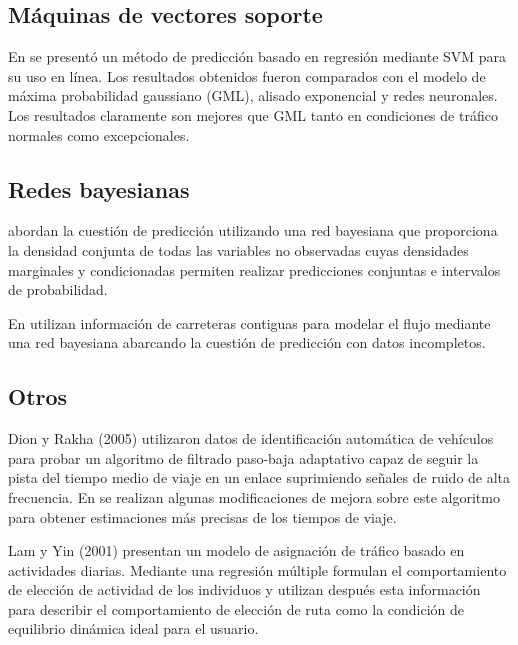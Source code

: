 \documentclass{llncs}
\begin{document}
\subsection{Máquinas de vectores soporte}

En \cite{castro2009online} se presentó un método de predicción basado en regresión mediante SVM para su uso en línea. Los resultados obtenidos fueron comparados con el modelo de máxima probabilidad gaussiano (GML), alisado exponencial y redes neuronales. Los resultados claramente son mejores que GML tanto en condiciones de tráfico normales como excepcionales.



\subsection{Redes bayesianas}
\cite{castillo2008predicting} abordan la cuestión de predicción utilizando una red bayesiana que proporciona la densidad conjunta de todas las variables no observadas cuyas densidades marginales y condicionadas permiten realizar predicciones conjuntas e intervalos de probabilidad.

En \cite{sun2006bayesian} utilizan información de carreteras contiguas para modelar el flujo mediante una red bayesiana abarcando la cuestión de predicción con datos incompletos.


\subsection{Otros}

Dion y Rakha (2005) \cite{dion2006estimating} utilizaron datos de identificación automática de vehículos para probar un algoritmo de filtrado paso-baja adaptativo capaz de seguir la pista del tiempo medio de viaje en un enlace suprimiendo señales de ruido de alta frecuencia.
En \cite{tam2008using} se realizan algunas modificaciones de mejora sobre este algoritmo para obtener estimaciones más precisas de los tiempos de viaje.

Lam y Yin (2001) \cite{lam2001activity} presentan un modelo de asignación de tráfico basado en actividades diarias. Mediante una regresión múltiple formulan el comportamiento de elección de actividad de los individuos y utilizan después esta información para describir el comportamiento de elección de ruta como la condición de equilibrio dinámica ideal para el usuario.





\end{document}
